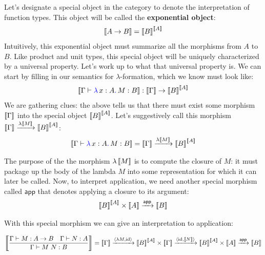 Let's designate a special object in the category 
to denote the interpretation of function types. This object 
will be called the \textbf{exponential object}:
\begin{align}
  \left\llbracket A \to B \right\rrbracket = \left\llbracket B \right\rrbracket^{\left\llbracket A \right\rrbracket}
\end{align}
Intuitively, this exponential object must summarize all the morphisms from $A$ 
to $B$.
Like product and unit types, this special object will be uniquely characterized 
by a universal property. Let's work up to what that universal property is.
We can start by filling in our semantics for $\lambda$-formation, 
which we know must look like:
\begin{align}
  \left\llbracket \Gamma \vdash {\color{blue}\lambda}\,x : A{\color{blue}.}\,M : B \right\rrbracket : \left\llbracket \Gamma \right\rrbracket \to \left\llbracket B \right\rrbracket^{\left\llbracket A \right\rrbracket}
\end{align}
We are gathering clues: the above tells us that there must exist some 
morphism $\left\llbracket \Gamma \right\rrbracket$ into the special object $\left\llbracket B \right\rrbracket^{\left\llbracket A \right\rrbracket}$. 
Let's suggestively call this morphism $\left\llbracket \Gamma \right\rrbracket \xrightarrow{\lambda \left\llbracket M \right\rrbracket} \left\llbracket B \right\rrbracket^{\left\llbracket A \right\rrbracket}$:
\begin{align}
  \left\llbracket \Gamma \vdash {\color{blue}\lambda}\,x : A{\color{blue}.}\,M : B \right\rrbracket = \left\llbracket \Gamma \right\rrbracket \xrightarrow{\lambda \left\llbracket M \right\rrbracket} 
  \left\llbracket B \right\rrbracket^{\left\llbracket A \right\rrbracket}
\end{align}

\newcommand\app{\mathsf{app}}
\newcommand\lam{\lambda}

The purpose of the the morphism $\lambda \left\llbracket M \right\rrbracket$ is to compute the closure
of $M$: it must package up the body of the lambda $M$ into some representation
for which it can later be called. Now, to interpret application, 
we need another special morphism called $\app{}$ that denotes applying a closure 
to its argument:
\begin{align}
  \dbracket{B}^{\dbracket{A}} \times \dbracket{A} \mor{\app{}} \dbracket{B}
\end{align}

With this special morphism we can give an interpretation to application: 
\begin{fullwidth}
\begin{align}
  \dbracket{\dfrac{\Gamma \vdash M : A \to B \quad \Gamma \vdash N : A}{\Gamma \vdash M~N : B}}
  = \dbracket{\Gamma} \mor{\langle \lambda M, \id \rangle} \dbracket{B}^{\dbracket{A}} \times \dbracket{\Gamma}
  \mor{\langle \id, \dbracket{N} \rangle } \dbracket{B}^{\dbracket{A}} \times \dbracket{A}
  \mor{\app{}} \dbracket{B}
\end{align}
\end{fullwidth}

